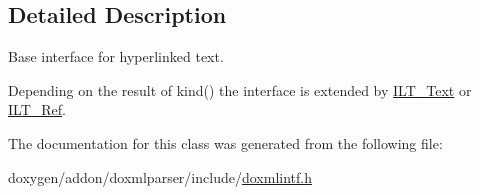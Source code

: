 \subsection{Detailed Description}
Base interface for hyperlinked text. 

Depending on the result of kind() the interface is extended by \mbox{\hyperlink{class_i_l_t___text}{I\+L\+T\+\_\+\+Text}} or \mbox{\hyperlink{class_i_l_t___ref}{I\+L\+T\+\_\+\+Ref}}. 

The documentation for this class was generated from the following file\+:\begin{DoxyCompactItemize}
\item 
doxygen/addon/doxmlparser/include/\mbox{\hyperlink{include_2doxmlintf_8h}{doxmlintf.\+h}}\end{DoxyCompactItemize}
